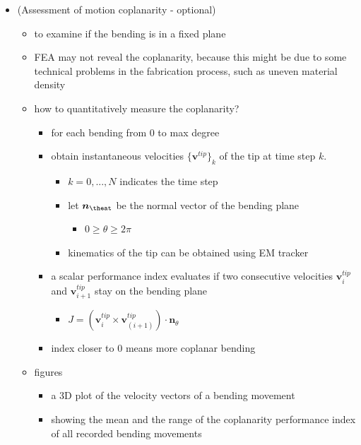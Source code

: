 \documentclass[journal,onecolumn]{IEEEtran}
\begin{document}
\begin{itemize}
\item (Assessment of motion coplanarity - optional)
\begin{itemize}
\item to examine if the bending is in a fixed plane
\item FEA may not reveal the coplanarity, because this might be due to some technical problems in the fabrication process, such as uneven material density
\item how to quantitatively measure the coplanarity?
\begin{itemize}
\item for each bending from 0 to max degree
\item obtain instantaneous velocities \(\{\bm{v}^{tip}\}_{k}\) of the tip at time step \(k\).
\begin{itemize}
\item \(k=0,...,N\) indicates the time step
\item let \(\bm{n}_{\theat}\) be the normal vector of the bending plane
\begin{itemize}
\item \(0\geq\theta\geq 2\pi\)
\end{itemize}
\item kinematics of the tip can be obtained using EM tracker
\end{itemize}
\item a scalar performance index evaluates if two consecutive velocities \(\bm{v}^{tip}_{i}\) and \(\bm{v}^{tip}_{i+1}\) stay on the bending plane
\begin{itemize}
\item \(J = (\bm{v}^{tip}_{i} \times \bm{v}^{tip}_{(i+1)}) \cdot \bm{n}_{\theta}\)
\end{itemize}
\item index closer to 0 means more coplanar bending
\end{itemize}
\item figures
\begin{itemize}
\item a 3D plot of the velocity vectors of a bending movement
\item showing the mean and the range of the coplanarity performance index of all recorded bending movements
\end{itemize}
\end{itemize}
\end{itemize}
\end{document}
